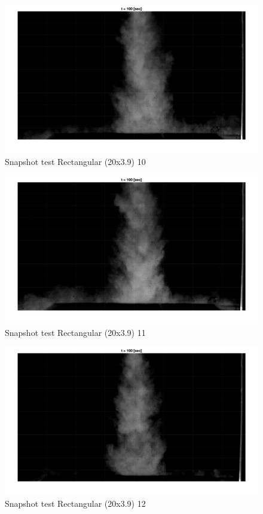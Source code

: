 \begin{figure}[ht!]
    \centering
    \includegraphics[width=\linewidth]{Images/Rec20_10_t100.jpg}
    \caption{Snapshot test Rectangular (20x3.9) 10}
\end{figure}

\begin{figure}[ht!]
    \centering
    \includegraphics[width=\linewidth]{Images/Rec20_11_t100.jpg}
    \caption{Snapshot test Rectangular (20x3.9) 11}
\end{figure}

\begin{figure}[ht!]
    \centering
    \includegraphics[width=\linewidth]{Images/Rec20_12_t100.jpg}
    \caption{Snapshot test Rectangular (20x3.9) 12}
\end{figure}

